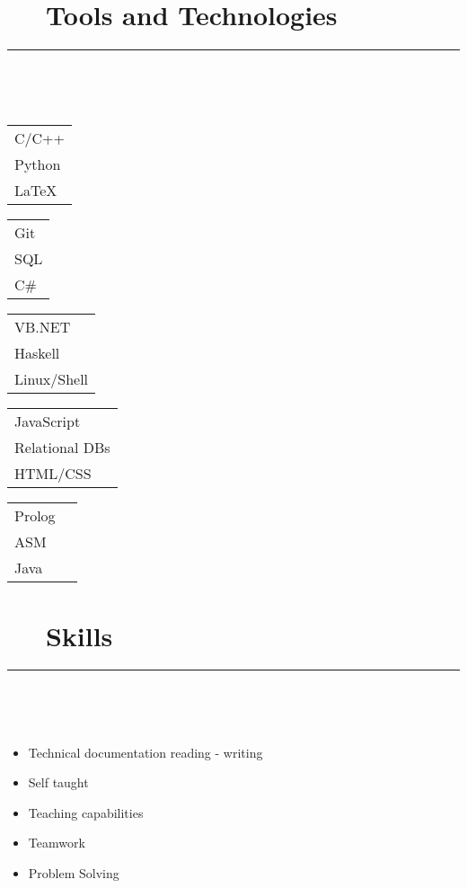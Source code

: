 \documentclass{article}
\begin{document}
\section*{\faCogs ~~ Tools and Technologies} 
\hrule
\

\
    
\begin{multicols}{5}
    \begin{tabular}{l}
        C/C++ \\
        Python \\
        LaTeX
    \end{tabular}

    \begin{tabular}{l}
        Git \\
        SQL \\
        C\#
    \end{tabular}
    
    \begin{tabular}{l}
        VB.NET \\
        Haskell \\
        Linux/Shell
    \end{tabular}
    
    \begin{tabular}{l}
        JavaScript \\
        Relational DBs \\
        HTML/CSS
    \end{tabular}
    
    \begin{tabular}{l l}
        Prolog \\
        ASM \\
        Java
    \end{tabular} 
\end{multicols}

\newpage

\section*{\faCoffee ~~ Skills} 
\hrule
\

\

\begin{multicols}{2}
    \begin{itemize}
        \item Technical documentation reading - writing
        \item Self taught
        \item Teaching capabilities
        \item Teamwork
        \item Problem Solving
    \end{itemize}
\end{multicols}
\end{document}

